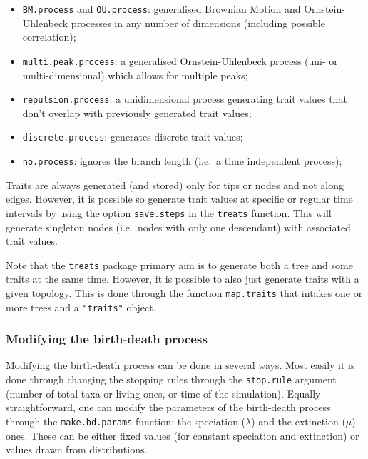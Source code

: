 \documentclass[
]{article}
\providecommand{\tightlist}{%
  \setlength{\itemsep}{0pt}\setlength{\parskip}{0pt}}
\begin{document}
\begin{itemize}
\tightlist
\item
  \texttt{BM.process} and \texttt{OU.process}: generalised Brownian
  Motion and Ornstein-Uhlenbeck processes in any number of dimensions
  (including possible correlation);
\item
  \texttt{multi.peak.process}: a generalised Ornstein-Uhlenbeck process
  (uni- or multi-dimensional) which allows for multiple peaks;
\item
  \texttt{repulsion.process}: a unidimensional process generating trait
  values that don't overlap with previously generated trait values;
\item
  \texttt{discrete.process}: generates discrete trait values;
\item
  \texttt{no.process}: ignores the branch length (i.e.~a time
  independent process);
\end{itemize}

Traits are always generated (and stored) only for tips or nodes and not
along edges. However, it is possible so generate trait values at
specific or regular time intervals by using the option
\texttt{save.steps} in the \texttt{treats} function. This will generate
singleton nodes (i.e.~nodes with only one descendant) with associated
trait values.

Note that the \texttt{treats} package primary aim is to generate both a
tree and some traits at the same time. However, it is possible to also
just generate traits with a given topology. This is done through the
function \texttt{map.traits} that intakes one or more trees and a
\texttt{"traits"} object.

\hypertarget{modifying-the-birth-death-process}{%
\subsubsection{Modifying the birth-death
process}\label{modifying-the-birth-death-process}}

Modifying the birth-death process can be done in several ways. Most
easily it is done through changing the stopping rules through the
\texttt{stop.rule} argument (number of total taxa or living ones, or
time of the simulation). Equally straightforward, one can modify the
parameters of the birth-death process through the
\texttt{make.bd.params} function: the speciation (\(\lambda\)) and the
extinction (\(\mu\)) ones. These can be either fixed values (for
constant speciation and extinction) or values drawn from distributions.
\end{document}
